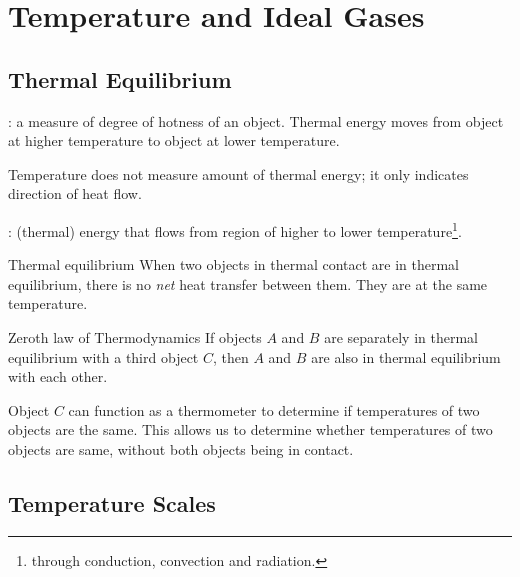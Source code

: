 \section{Temperature and Ideal Gases}
\subsection{Thermal Equilibrium}
: a measure of degree of hotness of an object. Thermal energy moves from object at higher temperature to object at lower temperature.

\begin{remark}
Temperature does not measure amount of thermal energy; it only indicates direction of heat flow.
\end{remark}

: (thermal) energy that flows from region of higher to lower temperature\footnote{through conduction, convection and radiation.}. 

\begin{defn}{Thermal equilibrium}{}
When two objects in thermal contact are in thermal equilibrium, there is no \emph{net} heat transfer between them. They are at the same temperature.
\end{defn}

\begin{defn}{Zeroth law of Thermodynamics}{}
If objects $A$ and $B$ are separately in thermal equilibrium with a third object $C$, then $A$ and $B$ are also in thermal equilibrium with each other.
\end{defn}

\begin{remark}
Object $C$ can function as a thermometer to determine if temperatures of two objects are the same. This allows us to determine whether temperatures of two objects are same, without both objects being in contact.
\end{remark}
\pagebreak

\subsection{Temperature Scales}
